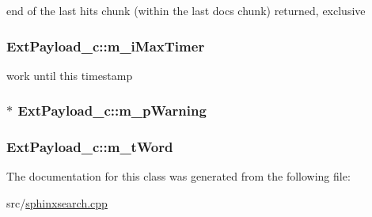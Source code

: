 end of the last hits chunk (within the last docs chunk) returned, exclusive 

\hypertarget{classExtPayload__c_a413e80ba76fce68864326584a3621527}{
\subsubsection[{m\-\_\-i\-Max\-Timer}]{ Ext\-Payload\-\_\-c\-::m\-\_\-i\-Max\-Timer\hspace{0.3cm}{\ttfamily [private]}}}\label{classExtPayload__c_a413e80ba76fce68864326584a3621527}


work until this timestamp 

\hypertarget{classExtPayload__c_ab86bd34a7a3ccabfc3983f673e335431}{
\subsubsection[{m\-\_\-p\-Warning}]{$\ast$ Ext\-Payload\-\_\-c\-::m\-\_\-p\-Warning\hspace{0.3cm}{\ttfamily [private]}}}\label{classExtPayload__c_ab86bd34a7a3ccabfc3983f673e335431}
\hypertarget{classExtPayload__c_a7187e34956ba7f9bb8d55a9cf8c7c0fe}{
\subsubsection[{m\-\_\-t\-Word}]{ Ext\-Payload\-\_\-c\-::m\-\_\-t\-Word\hspace{0.3cm}{\ttfamily [private]}}}\label{classExtPayload__c_a7187e34956ba7f9bb8d55a9cf8c7c0fe}


The documentation for this class was generated from the following file\-:\begin{DoxyCompactItemize}
\item 
src/\hyperlink{sphinxsearch_8cpp}{sphinxsearch.\-cpp}\end{DoxyCompactItemize}
